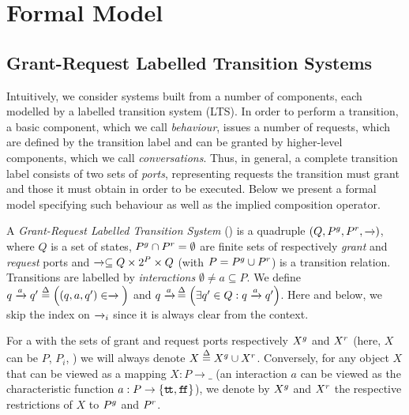 
\section{Formal Model}
\label{sec:formal}


\subsection{Grant-Request Labelled Transition Systems}
\label{sec:model}

Intuitively, we consider systems built from a number of components, each
modelled by a labelled transition system (LTS).  In order to perform a
transition, a basic component, which we call \emph{behaviour}, issues a
number of requests, which are defined by the transition label and can be
granted by higher-level components, which we call \emph{conversations}.
Thus, in general, a complete transition label consists of two sets of {\em
  ports}, representing requests the transition must grant and those it must
obtain in order to be executed.  Below we present a formal model specifying
such behaviour as well as the implied composition operator.

\begin{definition}
  \label{defn:lts}
  A \emph{Grant-Request Labelled Transition System} (\compmodel{}) is a
  quadruple $(Q,{P}^{g},{P}^{r},\xrightarrow[]{})$, where $Q$ is a set of states, ${P}^{g}
  \cap {P}^{r} = \emptyset$ are finite sets of respectively \emph{grant} and
  \emph{request} ports and $\xrightarrow[]{} \subseteq Q \times 2^P \times Q$
  (with $P = {P}^{g} \cup {P}^{r}$) is a transition relation.  Transitions are
  labelled by \emph{interactions} $\emptyset \neq a \subseteq P$.  We
  define $q \xrightarrow[]{a} q' \stackrel{\Delta}{=}\Big((q, a, q') \in \xrightarrow[]{}\Big)$ and
  $q \xrightarrow[]{a}\, \stackrel{\Delta}{=}\Big(\exists q' \in Q: q \xrightarrow[]{a} q'\Big)$.
  Here and below, we skip the index on $\xrightarrow[]{}_i$ since it is always clear
  from the context.
\end{definition}

\begin{notation}
  \label{ntn:lts}
  For a \compmodel{} with the sets of grant and request ports respectively
  ${X}^{g}$ and ${X}^{r}$ (here, $X$ can be $P$, $P_i$, \etc[]) we
  will always denote $X \stackrel{\Delta}{=} {X}^{g} \cup {X}^{r}$.  Conversely,
  for any object $X$ that can be viewed as a mapping $X : P \rightarrow \_$
  (\eg an interaction $a$ can be viewed as the characteristic function $a :
  P \rightarrow \{\mathtt{t\!t},\mathtt{f\!f}\}$), we denote by ${X}^{g}$ and
  ${X}^{r}$ the respective restrictions of $X$ to ${P}^{g}$ and
  ${P}^{r}$.
\end{notation}

